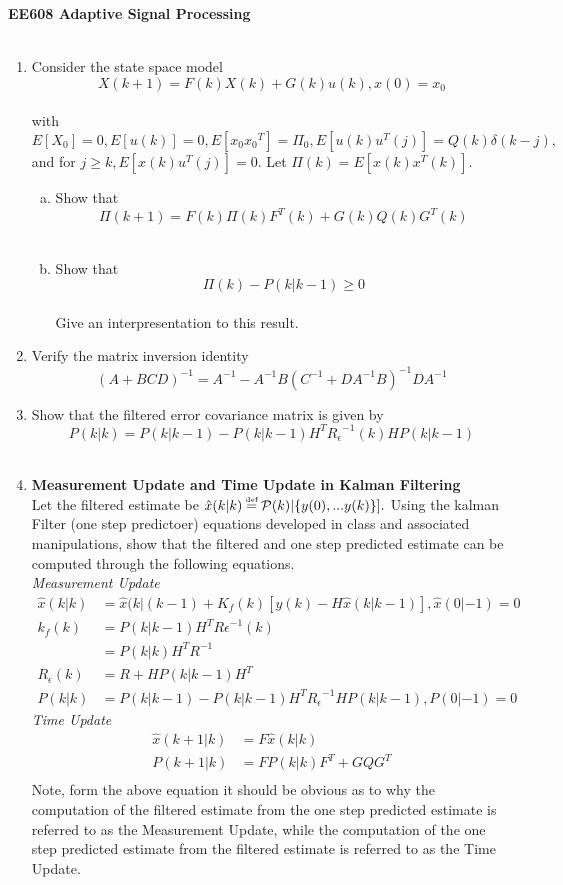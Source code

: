 \documentclass[journal,12pt,onecolumn]{IEEEtran}
\newcommand\myeq{\mathrel{\stackrel{\makebox[0pt]{\mbox{\normalfont\tiny def}}}{=}}}
\begin{document}
\centering \textbf{EE608  Adaptive Signal Processing}\\
\\
\bigskip
\begin{enumerate}
\item Consider the state space model
$$X(k+1)=F(k)X(k)+G(k)u(k),    x(0)=x_{0}$$\\
with $E[X_0]=0, E[u(k)]=0, E[x_{0}{x_{0}}^T]=\Pi_{0}, E[u(k)u^T(j)]=Q(k)\delta(k-j),$ and for $j \geq {k},E[x(k)u^T(j)]=0.$ 
Let $\Pi(k)=E[x(k)x^T(k)].$   
\bigskip
\begin{enumerate}[(a)]
\item Show that\\
$$\Pi(k+1)=F(k)\Pi(k){F^{T}(k)}+G(k)Q(k)G^T(k)$$\\
\bigskip
\item Show that\\
$$\Pi(k)-P(k\vert{k-1})\geq {0}$$\\
\bigskip
Give an interpresentation to this result.
\end{enumerate}
\medskip
\item Verify the matrix inversion identity
$${(A+BCD)^{-1}}=A^{-1}-A^{-1}B{(C^{-1}+D{A^{-1}}B)}^{-1}DA^{-1}$$
\medskip
\item Show that the filtered error covariance matrix is given by\\
\medskip
$$P(k \vert k)=P(k \vert {k-1})-P(k \vert {k-1})H^T{R_\epsilon}^{-1}(k)HP(k \vert {k-1})$$\\
\item \textbf{Measurement Update and Time Update in Kalman Filtering}\\
Let the filtered estimate be ${\hat{x}(k \vert k)}\myeq {\mathcal{P}}(k) \vert \{y(0),... y(k)\}].$ Using the kalman Filter (one step predictoer) equations developed in class and associated manipulations, show that the filtered and one step predicted estimate can be computed through the following equations.\\
\smallskip
\textit{Measurement Update} 
\bigskip
\begin{align*}
\hat{x}(k \vert k )& =\hat{x}(k \vert (k-1)+K_f(k)[y(k)-H\hat{x}(k\vert {k-1})], \hat{x}(0\vert {-1})=0\\
k_f(k)& =P(k\vert{k-1})H^T{R\epsilon}^{-1}(k)\\
&=P(k\vert k)H^TR^{-1}\\
R_\epsilon(k)& =R+HP(k\vert {k-1})H^T\\
P(k\vert k)& =P(k\vert {k-1})-P(k\vert{k-1})H^T{R_\epsilon}^{-1}HP(k\vert {k-1}), P(0\vert {-1})=0
\end{align*}
\textit{Time Update}
\bigskip
\begin{align*}
\hat{x}({k+1}\vert k) &=F{\hat{x}}(k \vert k)\\
P({k+1}\vert k) &=FP(k \vert k)F^T+GQG^T\\
\end{align*}
\medskip
Note, form the above equation it should be obvious as to why the computation of the filtered estimate from the one step predicted estimate is referred to as the Measurement Update, while the computation of the one step predicted estimate from the filtered estimate is referred to as the Time Update. 
\end{enumerate}
\end{document}
